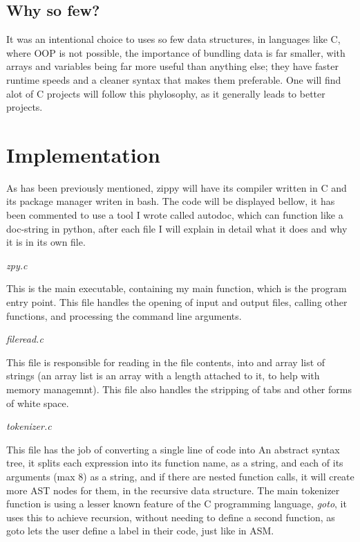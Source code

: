 \documentclass[a4paper,12pt]{article}
\begin{document}
{\subsection{Why so few?}
It was an intentional choice to uses so few data structures, in languages like C, where OOP is not possible,
the importance of bundling data is far smaller, with arrays and variables being far more useful than anything
else; they have faster runtime speeds and a cleaner syntax that makes them preferable. One will find alot of
C projects will follow this phylosophy, as it generally leads to better projects.

\section{Implementation}
As has been previously mentioned, zippy will have its compiler written in C and its package manager writen in bash.
The code will be displayed bellow, it has been commented to use a tool I wrote called autodoc, which can function
like a doc-string in python, after each file I will explain in detail what it does and why it is in its own file.


\textit{zpy.c}

This is the main executable, containing my main function, which is the program entry point. This file handles the
opening of input and output files, calling other functions, and processing the command line arguments.

\textit{fileread.c}

This file is responsible for reading in the file contents, into and array list of strings (an array list is an array
with a length attached to it, to help with memory managemnt). This file also handles the stripping of tabs and other 
forms of white space.


\textit{tokenizer.c}

This file has the job of converting a single line of code into An abstract syntax tree, it splits each expression into
its function name, as a string, and each of its arguments (max 8) as a string, and if there are nested function calls, 
it will create more AST nodes for them, in the recursive data structure. The main tokenizer function is using
a lesser known feature of the C programming language, \textit{goto}, it uses this to achieve recursion, without needing
to define a second function, as goto lets the user define a label in their code, just like in ASM. 

}
\end{document}
